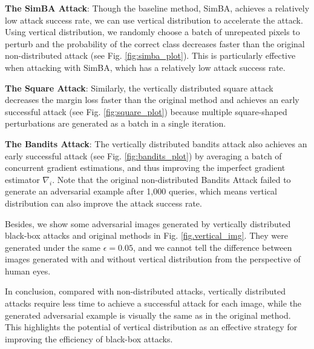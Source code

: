 \textbf{The SimBA Attack}: Though the baseline method, SimBA, achieves a relatively low attack success rate, we can use vertical distribution to accelerate the attack. Using vertical distribution, we randomly choose a batch of unrepeated pixels to perturb and the probability of the correct class decreases faster than the original non-distributed attack (see Fig. \ref{fig:simba_plot}). This is particularly effective when attacking with SimBA, which has a relatively low attack success rate. 



\textbf{The Square Attack}: Similarly, the vertically distributed square attack decreases the margin loss faster than the original method and achieves an early successful attack (see Fig. \ref{fig:square_plot}) because multiple square-shaped perturbations are generated as a batch in a single iteration.

\textbf{The Bandits Attack}: The vertically distributed bandits attack also achieves an early successful attack (see Fig. \ref{fig:bandits_plot}) by averaging a batch of concurrent gradient estimations, and thus improving the imperfect gradient estimator $\nabla_i$. Note that the original non-distributed Bandits Attack failed to generate an adversarial example after 1,000 queries, which means vertical distribution can also improve the attack success rate.

Besides, we show some adversarial images generated by vertically distributed black-box attacks and original methods in Fig. \ref{fig.vertical_img}. They were generated under the same $\epsilon=0.05$, and we cannot tell the difference between images generated with and without vertical distribution from the perspective of human eyes.

In conclusion, compared with non-distributed attacks, vertically distributed attacks require less time to achieve a successful attack for each image, while the generated adversarial example is visually the same as in the original method. This highlights the potential of vertical distribution as an effective strategy for improving the efficiency of black-box attacks.


